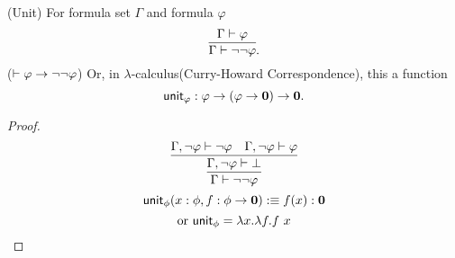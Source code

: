 \newcommand{\unit}{\name{unit}}
\begin{lemma}
    \label{unit-ipc}
    (Unit) For formula set $\Gamma$ and formula $\varphi$
    $$
        \infer{\Gamma\proves \neg\neg \varphi}{\Gamma\proves \varphi}.
    $$
    ($\vdash \varphi\to\neg\neg\varphi$)
    Or, in $\lambda$-calculus(Curry-Howard Correspondence), this a function
    $$
        \unit_\varphi: \varphi \to (\varphi\to \zero)\to \zero.
    $$
\end{lemma}
\begin{proof}
    $$
        \infer{\Gamma\proves \neg\neg \varphi}{
            \infer{\Gamma,\neg \varphi\proves\bot}{
                \Gamma,\neg \varphi\proves\neg \varphi &
                \Gamma,\neg \varphi\proves \varphi
            }
        }
    $$
    $$\unit_\phi(x:\phi, f:\phi\to\zero) \defn f(x):\zero$$
    $$\text{or }\unit_\phi = \lambda x.\lambda f. f\ x$$
\end{proof}

